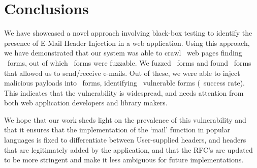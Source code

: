 \section{Conclusions}
We have showcased a novel approach involving black-box testing to identify the presence of E-Mail Header Injection in a web application. Using this approach, we have demonstrated that our system was able to crawl \urls\ web pages finding \forms\ forms, out of which \emailforms\ forms were fuzzable. We fuzzed \fuzzed\ forms and found \recd\  forms that allowed us to send/receive e-mails. Out of these, we were able to inject malicious payloads into \malfuzzed\ forms, identifying \success\ vulnerable forms (\successDelta\ success rate). This indicates that the vulnerability is widespread, and needs attention from both web application developers and library makers. 

We hope that our work sheds light on the prevalence of this vulnerability and that it ensures that the implementation of the `mail' function in popular languages is fixed to differentiate between User-supplied headers, and headers that are legitimately added by the application, and that the RFC's are updated to be more stringent and make it less ambiguous for future implementations. 